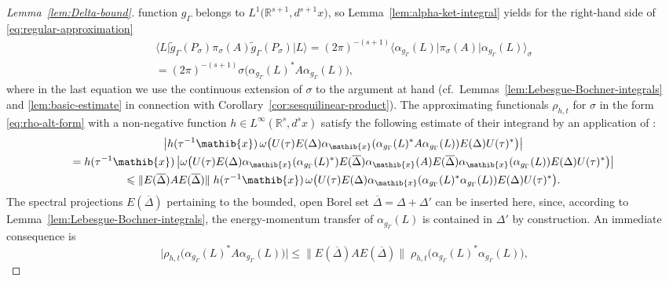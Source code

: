 \documentclass[a4paper,a4paper]{article}
\numberwithin{equation}{section}
\newcommand{\xib}{\mathib{x}}
\newcommand{\Rs}{\mathbb{R}^s}
\newcommand{\Rsone}{\mathbb{R}^{s + 1}}
\newcommand{\Deltabar}{\overline{\Delta}}
\newcommand{\ED}{E ( \Delta )}
\newcommand{\EDbar}{E ( \overline{\Delta} )}
\newcommand{\agGamma}{\alpha_{g_\Gamma}}
\newcommand{\aibx}{\alpha_\mathib{x}}
\theoremstyle{definition}
\theoremstyle{plain}
\theoremstyle{remark}
\newcommand{\babs}[1]{\bigl\lvert #1 \bigr\rvert}
\newcommand{\norm}[1]{\lVert #1 \rVert}
\newcommand{\scpx}[3]{\langle #1 \vert #2 \vert #3 \rangle}
\begin{document}
\begin{proof}[Lemma~\ref{lem:Delta-bound}]
    function $g_\Gamma$ belongs to $L^1 \bigl( \Rsone , d^{s
    + 1} x \bigr)$, so Lemma~\ref{lem:alpha-ket-integral} yields for
    the right-hand side of \eqref{eq:regular-approximation}
    \begin{multline}
      \label{eq:alpha-g-reformulation}
      \scpx{L}{\tilde{g}_\Gamma ( P_\sigma ) \pi_\sigma ( A )
      \tilde{g}_\Gamma ( P_\sigma )}{L} = ( 2 \pi )^{- ( s + 1 )} 
      \scpx{\agGamma ( L )}{\pi_\sigma ( A )}{\agGamma ( L )}_\sigma
      \\
      = ( 2 \pi )^{- ( s + 1 )} \sigma \bigl( \agGamma ( L )^* A
      \agGamma ( L ) \bigr) \text{,}
    \end{multline}
    where in the last equation we use the continuous extension of
    $\sigma$ to the argument at hand
    (cf.~Lemmas~\ref{lem:Lebesgue-Bochner-integrals} and
    \ref{lem:basic-estimate} in connection with
    Corollary~\ref{cor:sesquilinear-product}). The approximating
    functionals $\rho_{h , t}$ for $\sigma$ in the form
    \eqref{eq:rho-alt-form} with a non-negative function $h \in
    L^\infty ( \Rs , d^s x )$ satisfy the following estimate of their
    integrand by an application of
    \cite[Proposition~2.3.11]{bratteli/robinson:1987}:
    \begin{multline*}
      \babs{h ( \tau^{-1} \xib ) \, \omega \bigl( U ( \tau ) \ED \aibx
      ( \agGamma ( L )^* A \agGamma ( L ) ) \ED U ( \tau )^* \bigr)}
      \\ 
      = h ( \tau^{-1} \xib ) \, \babs{\omega \bigl( U ( \tau ) \ED
      \aibx (\agGamma ( L )^* ) \EDbar \aibx ( A ) \EDbar \aibx (
      \agGamma ( L ) ) \ED U ( \tau )^* \bigr)} \\
      \leqslant \norm{\EDbar A \EDbar} \; h ( \tau^{-1} \xib ) \,
      \omega \bigl( U ( \tau ) \ED \aibx ( \agGamma ( L )^* \agGamma (
      L ) ) \ED U ( \tau )^* \bigr) \text{.}
    \end{multline*}
    The spectral projections $\EDbar$ pertaining to the bounded, open
    Borel set $\Deltabar = \Delta + \Delta'$ can be inserted here,
    since, according to Lemma~\ref{lem:Lebesgue-Bochner-integrals},
    the energy-momentum transfer of $\agGamma ( L )$ is contained in
    $\Delta'$ by construction. An immediate consequence is
    \begin{equation*}
      \babs{\rho_{h , t} \bigl( \agGamma ( L )^* A \agGamma ( L )
      \bigr)} \leqslant \norm{\EDbar A \EDbar} \; \rho_{h , t}
      \bigl( \agGamma ( L )^* \agGamma ( L ) \bigr) \text{,}
    \end{equation*}

\end{proof}
\end{document}
